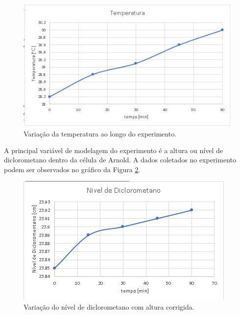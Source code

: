 \begin{figure}[H]
	\begin{center}
		\includegraphics[scale=0.8,trim={0 0 0 0}]{figuras/ladeq/difusao/tempGraph}
		\caption{Variação da temperatura ao longo do experimento.}
		\label{temp}
	\end{center}
\end{figure}

A principal variável de modelagem do experimento é a altura ou nível de diclorometano dentro da célula de Arnold. A dados coletados no experimento podem ser observados no gráfico da Figura \ref{diclo}.




\begin{figure}[H]
	\begin{center}
		\includegraphics[scale=1,trim={0 0 0 0}]{figuras/ladeq/difusao/nivelDiclo}
		\caption{Variação do nível de diclorometano com altura corrigida.}
		\label{diclo}
	\end{center}
\end{figure}


